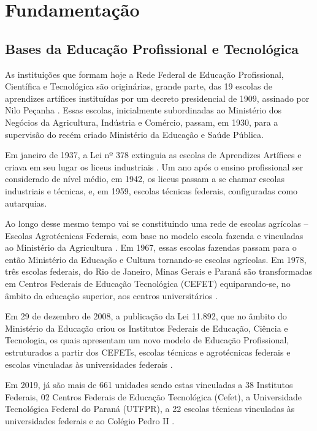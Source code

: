 \chapter{Fundamentação}
\label{fundamentacao}


\section{Bases da Educação Profissional e Tecnológica}
\label{ept}

As instituições que formam hoje a Rede Federal de Educação Profissional, Científica e Tecnológica são originárias, grande parte, das 19 escolas de aprendizes artífices instituídas por um decreto presidencial de 1909, assinado por Nilo Peçanha \cite{silva2009institutos}. Essas escolas, inicialmente subordinadas ao Ministério dos Negócios da Agricultura, Indústria e Comércio, passam, em 1930, para a supervisão do recém criado Ministério da Educação e Saúde Pública.


Em janeiro de 1937, a Lei nº 378 extinguia as escolas de Aprendizes Artífices e criava em seu lugar os liceus industriais \cite{candido2019era}. Um ano após o ensino profissional ser considerado de nível médio, em 1942, os liceus passam a se chamar escolas industriais e técnicas, e, em 1959, escolas técnicas federais, configuradas como autarquias.

Ao longo desse mesmo tempo vai se constituindo uma rede de escolas agrícolas – Escolas Agrotécnicas Federais, com base no modelo escola fazenda e vinculadas ao Ministério da Agricultura \cite{silva2009institutos}. Em 1967, essas escolas fazendas passam para o então Ministério da Educação e Cultura tornando-se escolas agrícolas. Em 1978, três escolas federais, do Rio de Janeiro, Minas Gerais e Paraná são transformadas em Centros Federais de Educação Tecnológica (CEFET) equiparando-se, no âmbito da educação superior, aos centros universitários \cite{silva2009institutos}.

Em 29 de dezembro de 2008, a publicação da Lei 11.892, que no âmbito do Ministério da Educação criou os Institutos Federais de Educação, Ciência e Tecnologia, os quais apresentam um novo modelo de Educação Profissional, estruturados a partir dos CEFETs, escolas técnicas e agrotécnicas federais e escolas vinculadas às universidades federais \cite{garcia2018educaccao}.


Em 2019, já são mais de 661 unidades sendo estas vinculadas a 38 Institutos Federais, 02 Centros Federais de Educação Tecnológica (Cefet), a Universidade Tecnológica Federal do Paraná (UTFPR), a 22 escolas técnicas vinculadas às universidades federais e ao Colégio Pedro II \cite{conif2023}. 

